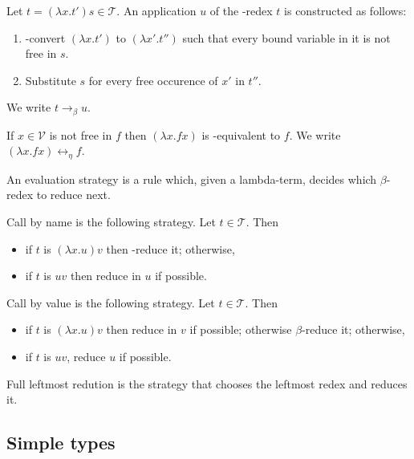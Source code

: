 \documentclass{article}
\begin{document}
\begin{definition*}
	Let $t=(\lambda x.t')s\in\mathcal{T}$. An application $u$ of the \beta-redex $t$ is constructed as follows:
	\begin{enumerate}
		\item \alpha-convert $(\lambda x. t')$ to $(\lambda x'.t'')$ such that every bound variable in it is
		      not free in $s$.
		\item Substitute $s$ for every free occurence of $x'$ in $t''$.
	\end{enumerate}
	We write $t\to_\beta u$.
\end{definition*}

\begin{definition*}
	If $x\in\mathcal{V}$ is not free in $f$ then $(\lambda x. f x)$ is \eta-equivalent to $f$. We write
	$(\lambda x. f x)\leftrightarrow_\eta f$.
\end{definition*}

\begin{definition*}[Evaluation]
	An evaluation strategy is a rule which, given a lambda-term, decides which $\beta$-redex to reduce
	next.

	Call by name is the following strategy. Let $t\in\mathcal{T}$. Then
	\begin{itemize}
		\item if $t$ is $(\lambda x. u) v$ then \beta-reduce it; otherwise,
		\item if $t$ is $uv$ then reduce in $u$ if possible.
	\end{itemize}
	Call by value is the following strategy. Let $t\in\mathcal{T}$. Then
	\begin{itemize}
		\item if $t$ is $(\lambda x. u) v$ then reduce in $v$ if possible; otherwise $\beta$-reduce it; otherwise,
		\item if $t$ is $uv$, reduce $u$ if possible.
	\end{itemize}
	Full leftmost redution is the strategy that chooses the leftmost redex and reduces it.
\end{definition*}


\subsection{Simple types}
\end{document}
